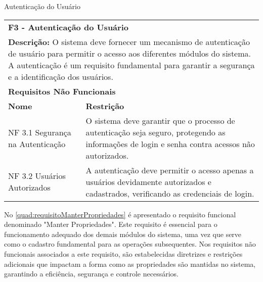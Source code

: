 \begin{tabframed}[htb]
  \caption{Autenticação do Usuário}
  \label{quad:requisitoAutenticacaoUsuario}
  \renewcommand{\arraystretch}{1.5}
  \begin{tabular}{|l|l|}
    \cline{1-2}
    \multicolumn{2}{|l|}{\textbf{F3 - Autenticação do Usuário}}
    \\ \cline{1-2}

    \multicolumn{2}{|p{15cm}|}{
    \raggedright \textbf{Descrição:} O sistema deve fornecer um mecanismo de autenticação de usuário para permitir o acesso aos diferentes módulos do sistema. A autenticação é um requisito fundamental para garantir a segurança e a identificação dos usuários.
    }
    \\ \cline{1-2}

    \multicolumn{2}{|l|}{\textbf{Requisitos Não Funcionais}}
    \\ \cline{1-2}

    \textbf{Nome}                    &
    \textbf{Restrição}
    \\ \cline{1-2}

    NF 3.1 Segurança na Autenticação &
    \multicolumn{1}{|p{9cm}|}{\raggedright O sistema deve garantir que o processo de autenticação seja seguro, protegendo as informações de login e senha contra acessos não autorizados.}
    \\ \cline{1-2}

    NF 3.2 Usuários Autorizados      &
    \multicolumn{1}{|p{9cm}|}{\raggedright A autenticação deve permitir o acesso apenas a usuários devidamente autorizados e cadastrados, verificando as credenciais de login.}
    \\ \cline{1-2}
  \end{tabular}
  \fonte{} %
\end{tabframed}

No \autoref{quad:requisitoManterPropriedades} é apresentado o requisito funcional denominado "Manter Propriedades". Este requisito é essencial para o funcionamento adequado dos demais módulos do sistema, uma vez que serve como o cadastro fundamental para as operações subsequentes. Nos requisitos não funcionais associados a este requisito, são estabelecidas diretrizes e restrições adicionais que impactam a forma como as propriedades são mantidas no sistema, garantindo a eficiência, segurança e controle necessários.

